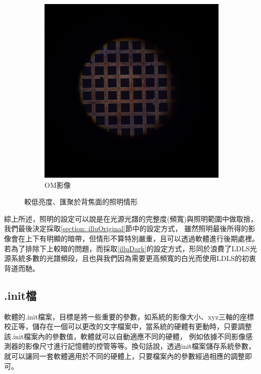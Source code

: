 \documentclass[12pt]{article}
\begin{document}
\begin{figure}
\begin{subfigure}[t]{0.45\textwidth}
        \includegraphics[width=\linewidth]{om_on_evenest.JPG}
        \caption{OM影像}
        \label{figure: evenest_on_om}
    \end{subfigure}
    \caption{較低亮度、匯聚於背焦面的照明情形}
\end{figure}

\par \noindent 綜上所述，照明的設定可以說是在光源光譜的完整度(頻寬)與照明範圍中做取捨，我們最後決定採取\ref{section: illuOriginal}節中的設定方式，
雖然照明最後所得的影像會在上下有明顯的暗帶，但情形不算特別嚴重，且可以透過軟體進行後期處裡。若為了排除下上較暗的問題，而採取\ref{illuDark}的設定方式，形同於浪費了LDLS光源系統多數的光譜頻段，且也與我們因為需要更高頻寬的白光而使用LDLS的初衷背道而馳。

\subsection{.init檔}
軟體的.init檔案，目標是將一些重要的參數，如系統的影像大小、xyz三軸的座標校正等，儲存在一個可以更改的文字檔案中，當系統的硬體有更動時，只要調整該.init檔案內的參數值，軟體就可以自動適應不同的硬體，
例如依據不同影像感測器的影像尺寸進行記憶體的控管等等。換句話說，透過init檔案儲存系統參數，就可以讓同一套軟體適用於不同的硬體上，只要檔案內的參數經過相應的調整即可。
\end{document}
